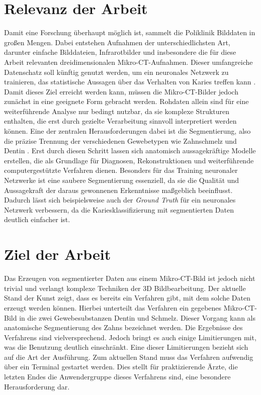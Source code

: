 \section{Relevanz der Arbeit}
\label{sec:relevanz_der_arbeit} Damit eine Forschung überhaupt möglich ist,
sammelt die Poliklinik Bilddaten in großen Mengen. Dabei entstehen Aufnahmen der
unterschiedlichsten Art, darunter einfache Bilddateien, Infrarotbilder und insbesondere
die für diese Arbeit relevanten dreidimensionalen Mikro-\ac{CT}-Aufnahmen. Dieser
umfangreiche Datenschatz soll künftig genutzt werden, um ein neuronales Netzwerk
zu trainieren, das statistische Aussagen über das Verhalten von Karies treffen kann
\citep[vgl.][S.~1]{walter2025projekt}. Damit dieses Ziel erreicht werden kann,
müssen die Mikro-\ac{CT}-Bilder jedoch zunächst in eine geeignete Form gebracht werden.
Rohdaten allein sind für eine weiterführende Analyse nur bedingt nutzbar, da sie
komplexe Strukturen enthalten, die erst durch gezielte Verarbeitung sinnvoll
interpretiert werden können. Eine der zentralen Herausforderungen dabei ist die Segmentierung,
also die präzise Trennung der verschiedenen Gewebetypen wie Zahnschmelz und
Dentin \citep[vgl.][S.~359]{lehmann2013bildverarbeitung}. Erst durch diesen
Schritt lassen sich anatomisch aussagekräftige Modelle erstellen, die als Grundlage
für Diagnosen, Rekonstruktionen und weiterführende computergestützte Verfahren
dienen. Besonders für das Training neuronaler Netzwerke ist eine saubere Segmentierung
essenziell, da sie die Qualität und Aussagekraft der daraus gewonnenen
Erkenntnisse maßgeblich beeinflusst. Dadurch lässt sich beispielsweise auch der \textit{Ground
Truth} für ein neuronales Netzwerk verbessern, da die Kariesklassifizierung mit segmentierten
Daten deutlich einfacher ist.

\section{Ziel der Arbeit}
\label{sec:ziel_der_arbeit} Das Erzeugen von segmentierter Daten aus einem Mikro-\ac{CT}-Bild
ist jedoch nicht trivial und verlangt komplexe Techniken der \ac{3D} Bildbearbeitung.
Der aktuelle Stand der Kunst zeigt, dass es bereits ein Verfahren gibt, mit dem
solche Daten erzeugt werden können. Hierbei unterteilt das Verfahren ein gegebenes
Mikro-\ac{CT}-Bild in die zwei Gewebesubstanzen Dentin und Schmelz. Dieser Vorgang
kann als anatomische Segmentierung des Zahns bezeichnet werden. Die Ergebnisse
des Verfahrens sind vielversprechend. Jedoch bringt es auch einige Limitierungen
mit, was die Benutzung deutlich einschränkt. Eine dieser Limitierungen bezieht sich
auf die Art der Ausführung. Zum aktuellen Stand muss das Verfahren aufwendig
über ein Terminal gestartet werden. Dies stellt für praktizierende Ärzte, die
letzten Endes die Anwendergruppe dieses Verfahrens sind, eine besondere Herausforderung
dar.

